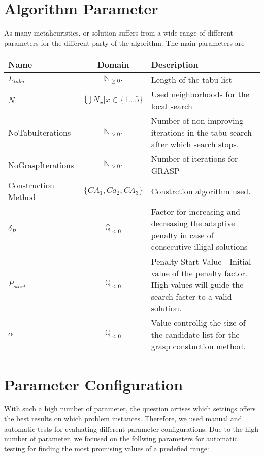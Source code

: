 \documentclass[a4paper,11pt]{article}
\begin{document}
\section{Algorithm Parameter}
As many metaheuristics, or solution suffers from a wide range of different parameters for the different party of the algorithm.
The main parameters are
\begin{center}
\begin{tabularx}{\linewidth}{| l | c | X | }
  \hline                       
  Name & Domain & Description \\   \hline     \hline    
  $L_{tabu}$ & $\mathbb{N}_{\geq0}.$ & Length of the tabu list \\ \hline    
  $N$ & $\bigcup N_x  | x \in \{1...5\}$ & Used neighborhoods for the local search \\ \hline   
  NoTabuIterations &  $\mathbb{N}_{ > 0}.$ & Number of non-improving iterations in the tabu search after which search stops. \\ \hline  
  NoGraspIterations &  $\mathbb{N}_{> 0}.$ & Number of iterations for \ac{GRASP} \\ \hline 
  Construction Method &  $\{CA_1, Ca_2, CA_3\}$ & Constrction algorithm used.\\ \hline 
  $ \delta_P $ &  $\mathbb{Q}_{\leq0}$ & Factor for increasing and decreasing the adaptive penalty in case of consecutive illigal solutions\\ \hline 
  $P_{start}$ &  $\mathbb{Q}_{\leq0}$ &Penalty Start Value -  Initial value of the penalty factor. High values will guide the search faster to a valid solution.\\ \hline    
  $\alpha$ & $\mathbb{Q}_{\leq0}$ & Value controllig the size of the candidate list for the grasp constuction method. \\ \hline    
  \hline  
\end{tabularx}
\end{center}

\section{Parameter Configuration}
With such a high number of parameter, the question arrises which settings offers the best results on which problem instances. Therefore, we used manual and 
automatic tests for evaluating different parameter configurations.
Due to the high number of parameter, we focused on the follwing parameters for automatic testing for finding the most promising values of a predefied range:
\end{document}
